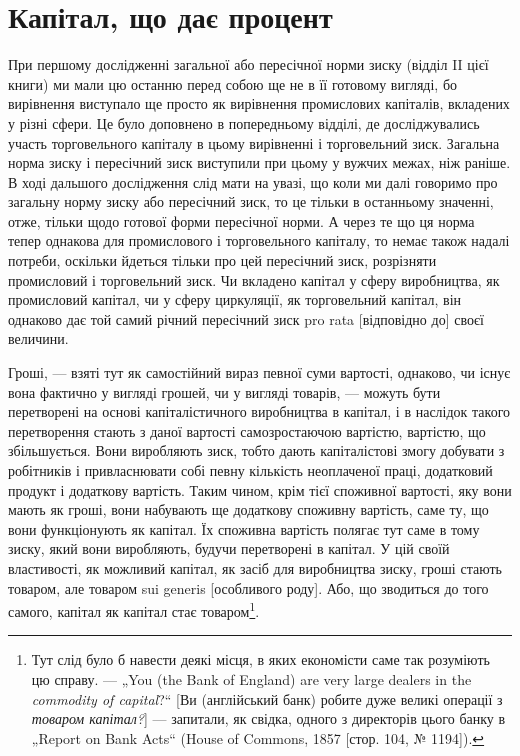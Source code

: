 

\section{Капітал, що дає процент}

\bigskip %
При першому дослідженні загальної або пересічної норми
зиску (відділ II цієї книги) ми мали цю останню перед собою
ще не в її готовому вигляді, бо вирівнення виступало ще просто
як вирівнення промислових капіталів, вкладених у різні сфери.
Це було доповнено в попередньому відділі, де досліджувались
участь торговельного капіталу в цьому вирівненні і торговельний
зиск. Загальна норма зиску і пересічний зиск виступили
при цьому у вужчих межах, ніж раніше. В ході дальшого
дослідження слід мати на увазі, що коли ми далі говоримо
про загальну норму зиску або пересічний зиск, то це тільки
в останньому значенні, отже, тільки щодо готової форми пересічної
норми. А через те що ця норма тепер однакова для промислового
і торговельного капіталу, то немає також надалі
потреби, оскільки йдеться тільки про цей пересічний зиск,
розрізняти промисловий і торговельний зиск. Чи вкладено капітал
у сферу виробництва, як промисловий капітал, чи у сферу циркуляції,
як торговельний капітал, він однаково дає той самий
річний пересічний зиск pro rata [відповідно до] своєї величини.

Гроші, — взяті тут як самостійний вираз певної суми вартості,
однаково, чи існує вона фактично у вигляді грошей, чи у
вигляді товарів, — можуть бути перетворені на основі капіталістичного
виробництва в капітал, і в наслідок такого перетворення
стають з даної вартості самозростаючою вартістю, вартістю,
що збільшується. Вони виробляють зиск, тобто дають
капіталістові змогу добувати з робітників і привласнювати собі
певну кількість неоплаченої праці, додатковий продукт і додаткову
вартість. Таким чином, крім тієї споживної вартості, яку
вони мають як гроші, вони набувають ще додаткову споживну
вартість, саме ту, що вони функціонують як капітал. Їх споживна
вартість полягає тут саме в тому зиску, який вони виробляють,
будучи перетворені в капітал. У цій своїй властивості,
як можливий капітал, як засіб для виробництва зиску, гроші
стають товаром, але товаром sui generis [особливого роду].
Або, що зводиться до того самого, капітал як капітал стає
товаром\footnote{
Тут слід було б навести деякі місця, в яких економісти саме так розуміють
цю справу. — „You (the Bank of England) are very large dealers in the
\emph{commodity of capital}?“ [Ви (англійський банк) робите дуже великі операції
з \emph{товаром капітал?}] — запитали, як свідка, одного з директорів цього банку
в „Report on Bank Acts“ (House of Commons, 1857 [стор. 104, № 1194]).
}.


